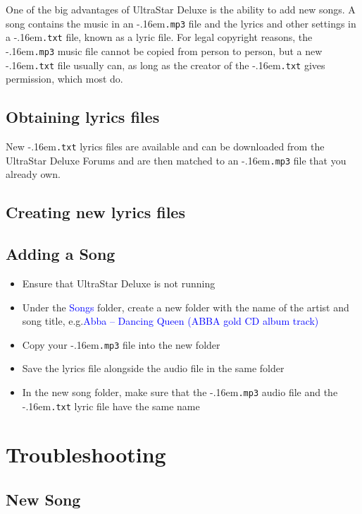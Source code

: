 \documentclass{scrreprt}
\newcommand*\fileending[1]{\texorpdfstring{\kern-.16em\texttt{#1}}{#1}}
\newcommand*\todomu[1]{\textcolor{blue}{#1}}
\begin{document}
One of the big advantages of UltraStar Deluxe
is the ability to add new songs.
A song contains the music in an \fileending{.mp3} file
and the lyrics and other settings in a \fileending{.txt} file,
known as a lyric file.
For legal copyright reasons,
the \fileending{.mp3} music file cannot be copied from person to person,
but a new \fileending{.txt} file usually can,
as long as the creator of the \fileending{.txt} gives permission, which most do.

\section{Obtaining lyrics files}
New \fileending{.txt} lyrics files are available
and can be downloaded from the UltraStar Deluxe Forums
and are then matched to an \fileending{.mp3} file that you already own.

\section{Creating new lyrics files}

\section{Adding a Song}
\begin{itemize}
\item Ensure that UltraStar Deluxe is not running
\item Under the \todomu{Songs} folder,
	create a new folder with the name of the artist and song title,
	e.g.\@ \todomu{Abba – Dancing Queen (ABBA gold CD album track)}
\item Copy your \fileending{.mp3} file into the new folder
\item Save the lyrics file alongside the audio file in the same folder
\item In the new song folder,
	make sure that the \fileending{.mp3} audio file
	and the \fileending{.txt} lyric file have the same name
\end{itemize}

\chapter{Troubleshooting}

\section{New Song}
\end{document}
